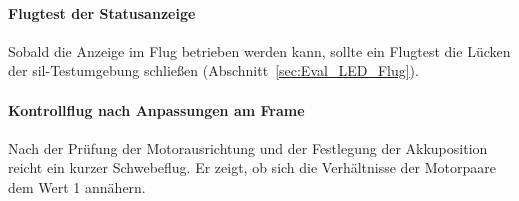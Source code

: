     \paragraph{Flugtest der Statusanzeige}
    Sobald die Anzeige im Flug betrieben werden kann, sollte ein Flugtest die Lücken der \gls{sil}-Testumgebung
    schließen (Abschnitt~\ref{sec:Eval_LED_Flug}).

    \paragraph{Kontrollflug nach Anpassungen am Frame}
    Nach der Prüfung der Motorausrichtung und der Festlegung der Akkuposition reicht ein kurzer Schwebeflug.
    Er zeigt, ob sich die Verhältnisse der Motorpaare dem Wert 1 annähern.
